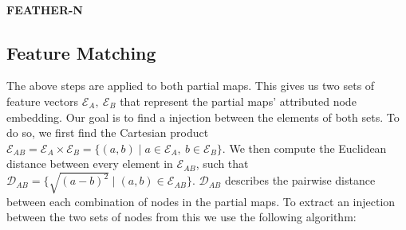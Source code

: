 \paragraph{FEATHER-N}

\subsection{Feature Matching}

The above steps are applied to both partial maps. This gives us two sets of feature vectors \(\mathcal{E}_A,\ \mathcal{E}_B\) that represent the partial maps' attributed node embedding. Our goal is to find a injection between the elements of both sets. To do so, we first find the Cartesian product \(\mathcal{E}_{AB} = \mathcal{E}_A \times \mathcal{E}_B = \{(a,b) \mid a \in \mathcal{E}_A,\ b \in \mathcal{E}_B\}\). We then compute the Euclidean distance between every element in \(\mathcal{E}_{AB}\), such that \(\mathcal{D}_{AB} = \{\sqrt{(a - b)^2} \mid (a, b) \in \mathcal{E}_{AB}\}\). \(\mathcal{D}_{AB}\) describes the pairwise distance between each combination of nodes in the partial maps. To extract an injection between the two sets of nodes from this we use the following algorithm:

